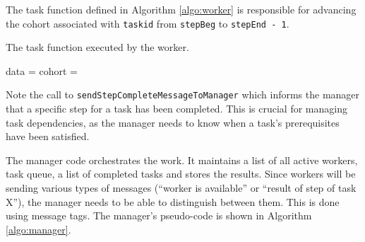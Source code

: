 \documentclass[a4paper,oneside,12pt]{article}
\begin{document}
The task function defined in Algorithm \ref{algo:worker} is responsible for advancing the cohort associated with \verb|taskid| from \verb|stepBeg| to \verb|stepEnd - 1|.
\begin{algorithm}
\caption{The task function executed by the worker.}
    \begin{algorithmic}[1] %
    \State data = 
    \State cohort = 
        \State {}
        \State {}
    \EndFor
\EndFunction
\end{algorithmic}
\label{algo:worker}
\end{algorithm}
Note the call to \verb|sendStepCompleteMessageToManager| which informs the manager that a specific step for a task has been completed. 
This is crucial for managing task dependencies, as the manager needs to know when a task's prerequisites have been satisfied.

The manager code orchestrates the work. It maintains a list of all active workers, task queue, a list of completed tasks and stores the results. Since workers will be sending 
various types of messages (``worker is available'' or ``result of step of task X''), the manager needs to be able to distinguish between them. This is done using message tags.
The manager's pseudo-code is shown in Algorithm \ref{algo:manager}.
\end{document}
